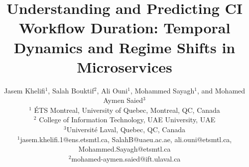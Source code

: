 \documentclass[conference]{IEEEconf}
\begin{document}
\title{\textbf{\Large Understanding and Predicting CI Workflow Duration: Temporal \\ Dynamics and Regime Shifts in Microservices\\}}

\author{Jasem Khelifi$^{1}$, Salah Bouktif$^{2}$, Ali Ouni$^{1}$, Mohammed Sayagh$^{1}$, and Mohamed Aymen Saied$^{3}$\\
	\normalsize $^{1}$ \'ETS Montreal, University of Quebec, Montreal, QC, Canada\\
    $^{2}$ College of Information Technology, UAE University, UAE\\
	\normalsize $^{3}$Universit\'e Laval, Quebec, QC, Canada\\
	\normalsize $^{1}$jasem.khelifi.1@ens.etsmtl.ca, SalahB@uaeu.ac.ae,  ali.ouni@etsmtl.ca, Mohammed.Sayagh@etsmtl.ca\\
	\normalsize $^{2}$mohamed-aymen.saied@ift.ulaval.ca
}

\maketitle
\end{document}
